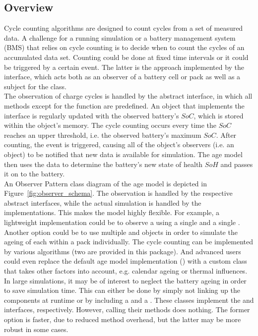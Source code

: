 \subsection{Overview}
Cycle counting algorithms are designed to count cycles from a set of measured data. A challenge for a running simulation or a battery management system (BMS) that relies on cycle counting is to decide when to count the cycles of an accumulated data set. Counting could be done at fixed time intervals or it could be triggered by a certain event. The latter is the approach implemented by the  interface, which acts both as an observer of a battery cell or pack as well as a subject for the  class.\\
The observation of charge cycles is handled by the abstract  interface, in which all methods except for the  function are predefined. An object that implements the interface is regularly updated with the observed battery's $SoC$, which is stored within the object's memory. The cycle counting occurs every time the $SoC$ reaches an upper threshold, i.e. the observed battery's maximum $SoC$. After counting, the  event is triggered, causing all of the object's observers (i.e. an  object) to be notified that new data is available for simulation. The age model then uses the data to determine the battery's new state of health $SoH$ and passes it on to the battery. \\
An Observer Pattern class diagram of the age model is depicted in Figure~\ref{fig:observer_schema}. The observation is handled by the respective abstract interfaces, while the actual simulation is handled by the implementations. This makes the model highly flexible. For example, a lightweight implementation could be to observe a  using a single  and a single . Another option could be to use multiple  and  objects in order to simulate the ageing of each  within a pack individually. The cycle counting can be implemented by various algorithms (two are provided in this package). And advanced users could even replace the default age model implementation () with a custom class that takes other factors into account, e.g. calendar ageing or thermal influences. In large simulations, it may be of interest to neglect the battery ageing in order to save simulation time. This can either be done by simply not linking up the components at runtime or by including a  and a . These classes implement the  and  interfaces, respectively. However, calling their methods does nothing. The former option is faster, due to reduced method overhead, but the latter may be more robust in some cases.
